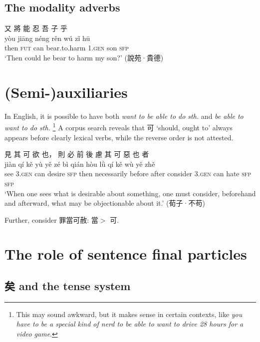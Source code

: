 \documentclass[UTF8, a4paper, oneside, scheme=plain, 12pt]{ctexrep}
\newcommand*{\textgt}{$>$ }
\newcommand{\form}[1]{\emph{#1}}
\newcommand{\translate}[1]{`#1'}
\newcommand*{\category}[1]{\textsc{#1}}
\begin{document}
\subsection{The modality adverbs}

\begin{exe}
    \ex\label{ex:tam.adverb.low-modality.1}
    \glll 又 將 能 忍 吾 子 乎 \\
    yòu jiāng néng rěn wú zǐ hū \\
    then \category{fut} can bear.to.harm 1.\category{gen} son \category{sfp} \\
    \glt\translate{Then could he bear to harm my son?} \hfill (說苑·貴德)
\end{exe}

\section{(Semi-)auxiliaries}

In English, it is possible to have both \form{want to be able to do sth.} 
and \form{be able to want to do sth.}%
\footnote{
    This may sound awkward, but it makes sense in certain contexts, like 
    \form{you have to be a special kind of nerd to be able to want to drive 28 hours for a video game}.
}
A corpus search reveals that 可 \translate{should, ought to} always appears before clearly lexical verbs,
while the reverse order is not attested.

\begin{exe}
    \ex
    \glll 見 其 可 欲 也， 則 必 前 後 慮 其 可 惡 也 者 \\
    jiàn qí kě yù yě zé bì qián hòu lǜ qí kě wù yě zhě \\
    see 3.\category{gen} can desire \category{sfp} then necessarily before after consider 3.\category{gen} can hate \category{sfp} \category{sfp} \\
    \glt\translate{When one sees what is desirable about something, one must consider, beforehand and afterward, what may be objectionable about it.} \hfill (荀子·不苟)
\end{exe}

Further, consider 罪當可赦: 當\textgt 可.

\section{The role of sentence final particles}\label{sec:tam.sfp}

\subsection{矣 and the tense system}\label{sec:tam.sfp.yi}
\end{document}
